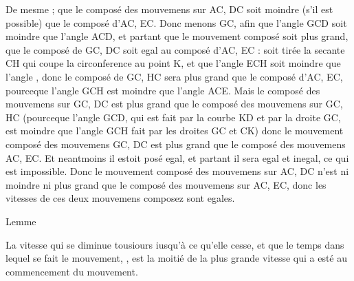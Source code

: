 \documentclass[11pt,a4paper]{article}
\begin{document}
De mesme ; que le composé des mouvemens sur AC, DC soit moindre (s'il est possible) que le composé d'AC, EC. Donc menons GC, afin que  l'angle GCD soit moindre que l'angle ACD, et partant que le mouvement composé soit plus grand, que le composé de GC, DC soit egal au composé d'AC, EC : soit tirée la secante CH qui coupe la circonference au point K, et que l'angle ECH soit moindre que l'angle , donc le composé de GC, HC sera plus grand que le composé d'AC, EC, pourceque l'angle GCH est moindre que l'angle ACE. Mais le composé des mouvemens sur GC, DC est plus grand que le composé des mouvemens sur GC, HC (pourceque l'angle GCD, \struck{\ill{}} qui est fait par la courbe KD et par la droite GC, est moindre que l'angle GCH fait  par les droites GC et CK) donc le mouvement composé des mouvemens GC, DC est plus grand que le composé  des mouvemens AC, EC. Et neantmoins il estoit posé egal, et partant il sera egal et inegal, ce qui est impossible. Donc le mouvement composé des mouvemens sur AC, DC n'est ni moindre ni plus grand que le composé des mouvemens sur AC, EC, donc les vitesses de ces deux mouvemens composez sont egales.


Lemme

La vitesse qui se diminue tousiours iusqu'à ce qu'elle cesse, et \ill{} que le temps dans lequel se fait le mouvement, \ill{}, est la moitié de la plus grande vitesse qui a esté au commencement du mouvement.
\end{document}
